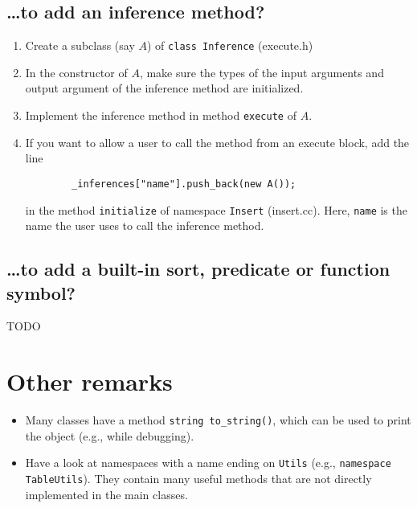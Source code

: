 \documentclass{article}
\begin{document}
\subsection*{\ldots to add an inference method?}
\begin{enumerate}
	\item Create a subclass (say $A$) of \texttt{class Inference} (execute.h)
	\item In the constructor of $A$, make sure the types of the input arguments and output argument of the inference method are initialized.
	\item Implement the inference method in method \texttt{execute} of $A$.
	\item If you want to allow a user to call the method from an execute block, add the line 
	\begin{lstlisting}
		_inferences["name"].push_back(new A());
	\end{lstlisting}
	in the method \texttt{initialize} of namespace \texttt{Insert} (insert.cc). Here, \texttt{name} is the name the user uses to call the inference method.
\end{enumerate}

\subsection*{\ldots to add a built-in sort, predicate or function symbol?}

TODO

\section{Other remarks}

\begin{itemize}
	\item Many classes have a method \texttt{string to\_string()}, which can be used to print the object (e.g., while debugging).
	\item Have a look at namespaces with a name ending on \texttt{Utils} (e.g., \texttt{namespace TableUtils}). They contain many useful methods that are not directly implemented in the main classes.
\end{itemize}
\end{document}
